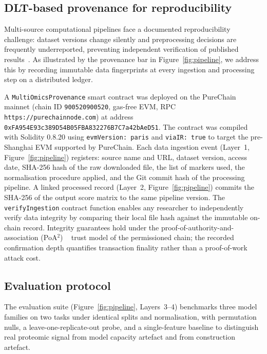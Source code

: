 \documentclass[5p,times,twocolumn]{elsarticle}
\begin{document}
\subsection{\textbf{DLT-based provenance for reproducibility}}
\label{sec:dlt}

Multi-source computational pipelines face a documented
reproducibility challenge: dataset versions change silently
and preprocessing decisions are frequently underreported,
preventing independent verification of published
results~\cite{kanu2024blockchain}.
As illustrated by the provenance bar in
Figure~\ref{fig:pipeline}, we address this by recording
immutable data fingerprints at every ingestion and
processing step on a distributed ledger.

A \texttt{MultiOmicsProvenance} smart contract was deployed
on the PureChain mainnet (chain ID \texttt{900520900520},
gas-free EVM, RPC \texttt{https://purechainnode.com}) at
address \texttt{0xFA954E93c389D54B05FBA832276B7C7a42bAeD51}.
The contract was compiled with Solidity 0.8.20 using
\texttt{evmVersion: paris} and \texttt{viaIR: true} to
target the pre-Shanghai EVM supported by PureChain.
Each data ingestion event (Layer~1, Figure~\ref{fig:pipeline})
registers: source name and URL, dataset version, access date,
SHA-256 hash of the raw downloaded file, the list of markers
used, the normalisation procedure applied, and the Git commit
hash of the processing pipeline.
A linked processed record (Layer~2, Figure~\ref{fig:pipeline})
commits the SHA-256 of the output score matrix to the same
pipeline version.
The \texttt{verifyIngestion} contract function enables any
researcher to independently verify data integrity by
comparing their local file hash against the immutable
on-chain record.
Integrity guarantees hold under the proof-of-authority-and-association (PoA$^2$) ~\cite{kanu2026offline} trust
model of the permissioned chain; the recorded confirmation
depth quantifies transaction finality rather than a
proof-of-work attack cost.

\subsection{\textbf{Evaluation protocol}}
\label{sec:eval}

The evaluation suite (Figure~\ref{fig:pipeline}, Layers~3--4)
benchmarks three model families on two tasks under identical
splits and normalisation, with permutation nulls, a
leave-one-replicate-out probe, and a single-feature baseline
to distinguish real proteomic signal from model capacity
artefact and from construction artefact.
\end{document}
